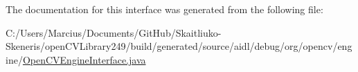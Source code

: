 The documentation for this interface was generated from the following file\+:\begin{DoxyCompactItemize}
\item 
C\+:/\+Users/\+Marcius/\+Documents/\+Git\+Hub/\+Skaitliuko-\/\+Skeneris/open\+C\+V\+Library249/build/generated/source/aidl/debug/org/opencv/engine/\mbox{\hyperlink{_open_c_v_engine_interface_8java}{Open\+C\+V\+Engine\+Interface.\+java}}\end{DoxyCompactItemize}
